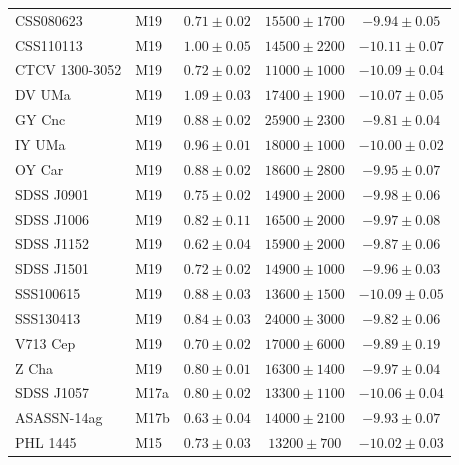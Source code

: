 \begin{table}
\begin{tabular}{llccc}
        CSS080623        &  M19  & $0.71 \pm 0.02$ & $15500\pm  1700$ & $ -9.94 \pm 0.05$ \\
        CSS110113        &  M19  & $1.00 \pm 0.05$ & $14500\pm  2200$ & $-10.11 \pm 0.07$ \\
        CTCV 1300-3052   &  M19  & $0.72 \pm 0.02$ & $11000\pm  1000$ & $-10.09 \pm 0.04$ \\
        DV UMa           &  M19  & $1.09 \pm 0.03$ & $17400\pm  1900$ & $-10.07 \pm 0.05$ \\
        GY Cnc           &  M19  & $0.88 \pm 0.02$ & $25900\pm  2300$ & $ -9.81 \pm 0.04$ \\
        IY UMa           &  M19  & $0.96 \pm 0.01$ & $18000\pm  1000$ & $-10.00 \pm 0.02$ \\
        OY Car           &  M19  & $0.88 \pm 0.02$ & $18600\pm  2800$ & $ -9.95 \pm 0.07$ \\
        SDSS J0901       &  M19  & $0.75 \pm 0.02$ & $14900\pm  2000$ & $ -9.98 \pm 0.06$ \\
        SDSS J1006       &  M19  & $0.82 \pm 0.11$ & $16500\pm  2000$ & $ -9.97 \pm 0.08$ \\
        SDSS J1152       &  M19  & $0.62 \pm 0.04$ & $15900\pm  2000$ & $ -9.87 \pm 0.06$ \\
        SDSS J1501       &  M19  & $0.72 \pm 0.02$ & $14900\pm  1000$ & $ -9.96 \pm 0.03$ \\
        SSS100615        &  M19  & $0.88 \pm 0.03$ & $13600\pm  1500$ & $-10.09 \pm 0.05$ \\
        SSS130413        &  M19  & $0.84 \pm 0.03$ & $24000\pm  3000$ & $ -9.82 \pm 0.06$ \\
        V713 Cep         &  M19  & $0.70 \pm 0.02$ & $17000\pm  6000$ & $ -9.89 \pm 0.19$ \\
        Z Cha            &  M19  & $0.80 \pm 0.01$ & $16300\pm  1400$ & $ -9.97 \pm 0.04$ \\
        SDSS J1057       &  M17a & $0.80 \pm 0.02$ & $13300\pm  1100$ & $-10.06 \pm 0.04$ \\
        ASASSN-14ag      &  M17b & $0.63 \pm 0.04$ & $14000\pm  2100$ & $ -9.93 \pm 0.07$ \\
        PHL 1445         &  M15  & $0.73 \pm 0.03$ & $13200\pm   700$ & $-10.02 \pm 0.03$ \\
        \hline
    \end{tabular}
\end{table}

